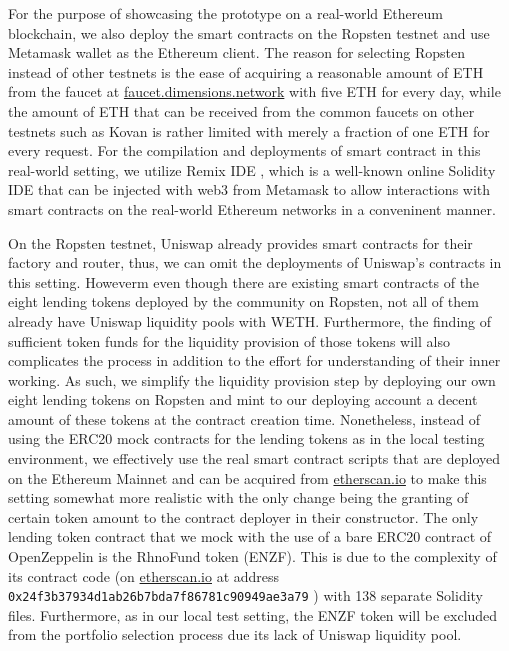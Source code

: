 For the purpose of showcasing the prototype on a real-world Ethereum blockchain, we also deploy the smart contracts on the Ropsten testnet and use Metamask wallet as the Ethereum client. The reason for selecting Ropsten instead of other testnets is the ease of acquiring a reasonable amount of ETH from the faucet at \url{faucet.dimensions.network} with five ETH for every day, while the amount of ETH that can be received from the common faucets on other testnets such as Kovan is rather limited with merely a fraction of one ETH for every request. For the compilation and deployments of smart contract in this real-world setting, we utilize Remix IDE , which is a well-known online Solidity IDE that can be injected with web3 from Metamask to allow interactions with smart contracts on the real-world Ethereum networks in a conveninent manner.

On the Ropsten testnet, Uniswap already provides smart contracts for their factory and router, thus, we can omit the deployments of Uniswap's contracts in this setting. Howeverm even though there are existing smart contracts of the eight lending tokens deployed by the community on Ropsten, not all of them already have Uniswap liquidity pools with WETH. Furthermore, the finding of sufficient token funds for the liquidity provision of those tokens will also complicates the process in addition to the effort for understanding of their inner working. As such, we simplify the liquidity provision step by deploying our own eight lending tokens on Ropsten and mint to our deploying account a decent amount of these tokens at the contract creation time. Nonetheless, instead of using the ERC20 mock contracts for the lending tokens as in the local testing environment, we effectively use the real smart contract scripts that are deployed on the Ethereum Mainnet and can be acquired from \url{etherscan.io} to make this setting somewhat more realistic with the only change being the granting of certain token amount to the contract deployer in their constructor. The only lending token contract that we mock with the use of a bare ERC20 contract of OpenZeppelin is the RhnoFund token (ENZF). This is due to the complexity of its contract code (on \url{etherscan.io} at address \texttt{0x24f3b37934d1ab26b7bda7f86781c90949ae3a79} ) with 138 separate Solidity files. Furthermore, as in our local test setting, the ENZF token will be excluded from the portfolio selection process due its lack of Uniswap liquidity pool.

